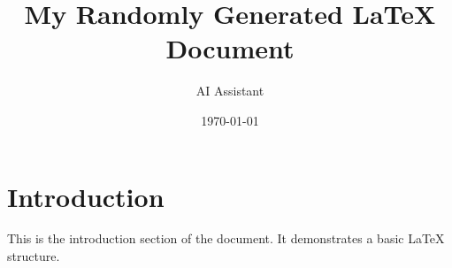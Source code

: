 \documentclass{article}
\title{My Randomly Generated LaTeX Document}
\author{AI Assistant}
\date{\today}
\begin{document}
\maketitle

\section{Introduction}
This is the introduction section of the document. It demonstrates a basic LaTeX structure.
\end{document}
